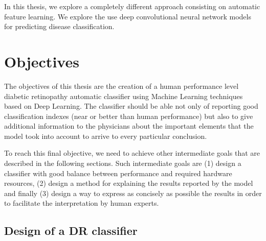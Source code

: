 In this thesis, we explore a completely different approach consisting on automatic feature learning. We explore the use deep convolutional neural network models for predicting disease classification. %

\section{Objectives}

The objectives of this thesis are the creation of a human performance level diabetic retinopathy automatic classifier using Machine Learning techniques based on Deep Learning. The classifier should be able not only of reporting good classification indexes (near or better than human performance) but also to give additional information to the physicians about the important elements that the model took into account to arrive to every particular conclusion.

To reach this final objective, we need to achieve other intermediate goals that are described in the following sections. Such intermediate goals are (1) design a classifier with good balance between performance and required hardware resources, (2) design a method for explaining the results reported by the model and finally (3) design a way to express as concisely as possible the results in order to facilitate the interpretation by human experts.
\subsection{Design of a DR classifier}


